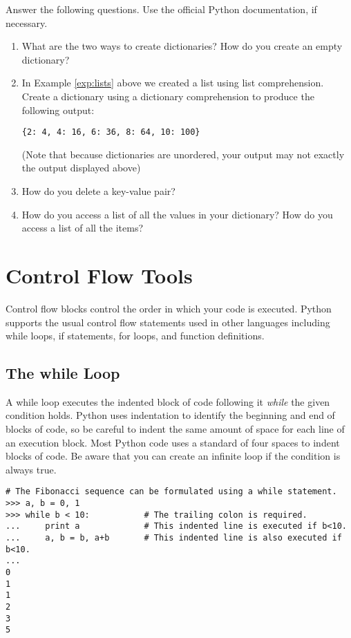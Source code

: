 \begin{problem}
Answer the following questions. Use the official Python documentation, if necessary.
\begin{enumerate}
\item What are the two ways to create dictionaries? How do you create an empty dictionary?
\item In Example \ref{exp:lists} above we created a list using list comprehension. Create a dictionary using a dictionary comprehension to produce the following output:

\begin{lstlisting}
{2: 4, 4: 16, 6: 36, 8: 64, 10: 100}
\end{lstlisting}

(Note that because dictionaries are unordered, your output may not exactly the output displayed above)
\item How do you delete a key-value pair?
\item How do you access a list of all the values in your dictionary?  
How do you access a list of all the items?
\end{enumerate}
\end{problem}


\section*{Control Flow Tools}
Control flow blocks control the order in which your code is executed.
Python supports the usual control flow statements used in other languages
including while loops, if statements, for loops, and function definitions. 

\subsection*{The while Loop}
\begin{example}
A while loop executes the indented block of code following it \emph{while} the given condition holds. Python uses indentation to identify the beginning and end of blocks of code, so be careful to indent the same amount of space for each line of an execution block.
Most Python code uses a standard of four spaces to indent blocks of code.
Be aware that you can create an infinite loop if the condition is always true.

\begin{lstlisting}
# The Fibonacci sequence can be formulated using a while statement. 
>>> a, b = 0, 1
>>> while b < 10:           # The trailing colon is required.
...     print a             # This indented line is executed if b<10.
...     a, b = b, a+b       # This indented line is also executed if b<10.
...     
0
1
1
2
3
5
\end{lstlisting}
\end{example}

